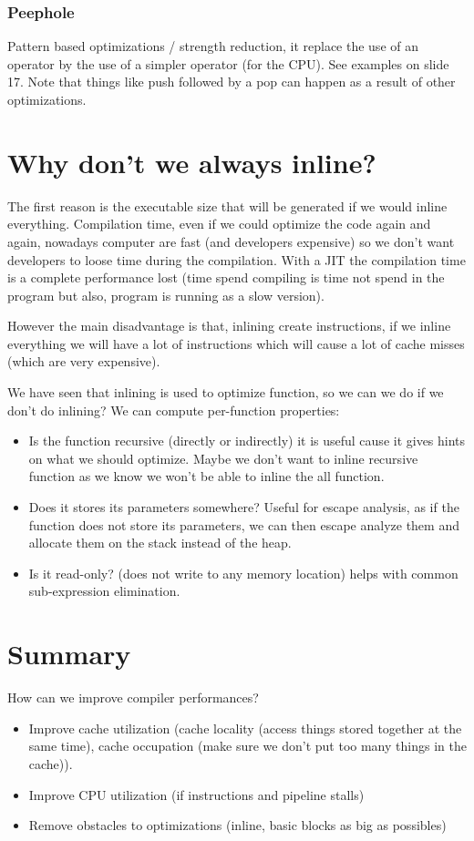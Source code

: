 \subsubsection{Peephole}
Pattern based optimizations / strength reduction, it replace the use of an
operator by the use of a simpler operator (for the CPU). See examples on slide
17. Note that things like push followed by a pop can happen as a result of other
optimizations.
\section{Why don't we always inline?}
The first reason is the executable size that will be generated if we would
inline everything. Compilation time, even if we could optimize the code again
and again, nowadays computer are fast (and developers expensive) so we don't
want developers to loose time during the compilation. With a JIT the compilation
time is a complete performance lost (time spend compiling is time not spend in
the program but also, program is running as a slow version).

However the main disadvantage is that, inlining create instructions, if we
inline everything we will have a lot of instructions which will cause a lot of
cache misses (which are very expensive).
 
We have seen that inlining is used to optimize function, so we can we do if we
don't do inlining? We can compute per-function properties:
\begin{itemize}
    \item Is the function recursive (directly or indirectly) it is useful cause
    it gives hints on what we should optimize. Maybe we don't want to inline
    recursive function as we know we won't be able to inline the all function.
    \item Does it stores its parameters somewhere? Useful for escape analysis,
    as if the function does not store its parameters, we can then escape analyze
    them and allocate them on the stack instead of the heap.
    \item Is it read-only? (does not write to any memory location) helps with
    common sub-expression elimination.
\end{itemize}
\section{Summary}
How can we improve compiler performances?
\begin{itemize}
    \item Improve cache utilization (cache locality (access things stored
    together at the same time), cache occupation (make sure we don't put too
    many things in the cache)).
    \item Improve CPU utilization (if instructions and pipeline stalls)
    \item Remove obstacles to optimizations (inline, basic blocks as big as possibles)
\end{itemize}
